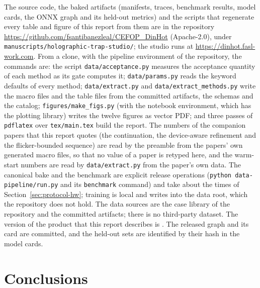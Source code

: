 The source code, the baked artifacts (manifests, traces, benchmark results, model cards, the ONNX graph and its held-out metrics) and the scripts that regenerate every table and figure of this report from them are in the repository \url{https://github.com/fsantibanezleal/CEFOP_DinHot} (Apache-2.0), under \texttt{manuscripts/holographic-trap-studio/}; the studio runs at \url{https://dinhot.fasl-work.com}. From a clone, with the pipeline environment of the repository, the commands are: the script \texttt{data/acceptance.py} measures the acceptance quantity of each method as its gate computes it; \texttt{data/params.py} reads the keyword defaults of every method; \texttt{data/extract.py} and \texttt{data/extract\_methods.py} write the macro files and the table files from the committed artifacts, the schemas and the catalog; \texttt{figures/make\_figs.py} (with the notebook environment, which has the plotting library) writes the twelve figures as vector PDF; and three passes of \texttt{pdflatex} over \texttt{tex/main.tex} build the report. The numbers of the companion papers that this report quotes (the continuation, the device-aware refinement and the flicker-bounded sequence) are read by the preamble from the papers' own generated macro files, so that no value of a paper is retyped here, and the warm-start numbers are read by \texttt{data/extract.py} from the paper's own data. The canonical bake and the benchmark are explicit release operations (\texttt{python data-pipeline/run.py} and its \texttt{benchmark} command) and take about the times of Section~\ref{sec:protocol-hw}; training is local and writes into the data root, which the repository does not hold. The data sources are the case library of the repository and the committed artifacts; there is no third-party dataset. The version of the product that this report describes is \productVersion{}. The released graph and its card are committed, and the held-out sets are identified by their hash in the model cards.

\section{Conclusions}\label{sec:conclusions}

